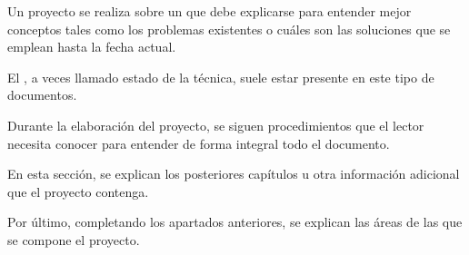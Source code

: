   Un proyecto se realiza sobre un  que debe explicarse para entender mejor conceptos tales como los problemas existentes o cuáles son las soluciones que se emplean hasta la fecha actual.

  El , a veces llamado estado de la técnica, suele estar presente en este tipo de documentos.
  
  Durante la elaboración del proyecto, se siguen procedimientos que el lector necesita conocer para entender de forma integral todo el documento.

 En esta sección, se explican los posteriores capítulos u otra información adicional que el proyecto contenga.

  Por último, completando los apartados anteriores, se explican las áreas de las que se compone el proyecto.

\chapterend
